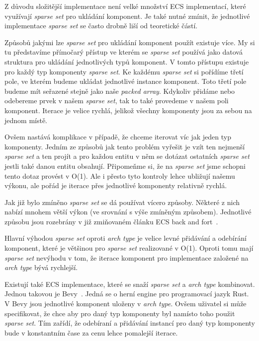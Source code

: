 
Z důvodu složitější implementace není velké množství ECS implementací, které využívají \textit{sparse set} pro ukládání komponent. Je také nutné zmínit, že jednotlivé implementace \textit{sparse set} se často drobně liší od teoretické částí.

Způsobů jakými lze \textit{sparse set} pro ukládání komponent použít existuje více. My si tu představíme přímočarý přístup ve kterém se \textit{sparse set} používá jako datová struktura pro ukládání jednotlivých typů komponent. V tomto přístupu existuje pro každý typ komponenty \textit{sparse set}. Ke každému \textit{sparse set} si pořídíme třetí pole, ve kterém budeme ukládat jednotlivé instance komponent. Toto třetí pole budeme mít seřazené stejně jako naše \textit{packed array}. Kdykoliv přidáme nebo odebereme prvek v našem \textit{sparse set}, tak to také provedeme v našem poli komponent. Iterace je velice rychlá, jelikož všechny komponenty jsou za sebou na jednom místě.

Ovšem nastává komplikace v případě, že chceme iterovat víc jak jeden typ komponenty. Jedním ze způsobů jak tento problém vyřešit je vzít ten nejmenší \textit{sparse set} a ten projít a pro každou entitu v něm se dotázat ostatních \textit{sparse set} jestli také danou entitu obsahují. Připomeňme si, že na \textit{sparse set} jsme schopni tento dotaz provést v O(1). Ale i přesto tyto kontroly lehce ubližují našemu výkonu, ale pořád je iterace přes jednotlivé komponenty relativně rychlá.

Jak již bylo zmíněno \textit{sparse set} se dá používat vícero způsoby. Některé z nich nabízí mnohem větší výkon (ve srovnání s výše zmíněným způsobem). Jednotlivé způsobu jsou rozebrány v již zmiňovaném článku ECS back and fort~\cite{Caini_2019}.

Hlavní výhodou \textit{sparse set} oproti \textit{arch type} je velice levné přidávání a odebírání komponent, které je většinou pro \textit{sparse set} realizované v O(1). Oproti tomu mají \textit{sparse set} nevýhodu v tom, že iterace komponent pro implementace založené na \textit{arch type} bývá rychlejší.

Existují také ECS implementace, které se snaží \textit{sparse set} a \textit{arch type} kombinovat. Jednou takovou je Bevy~\cite{Bevy}. Jedná se o herní engine pro programovací jazyk Rust. V Bevy jsou jednotlivé komponent uloženy v \textit{arch type}. Ovšem uživatel si může specifikovat, že chce aby pro daný typ komponenty byl namísto toho použit \textit{sparse set}. Tím zařídí, že odebíraní a přidávání instancí pro daný typ komponenty bude v konstantním čase za cenu lehce pomalejší iterace.

